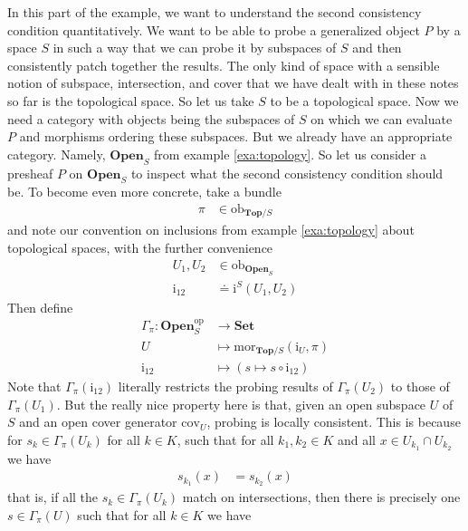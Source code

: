 \begin{exa}
\label{exa:gs2}
In this part of the example, we want to understand the second consistency condition quantitatively.
We want to be able to probe a generalized object $P$ by a space $S$ in such a way that we can probe it by subspaces of $S$ and then consistently patch together the results.
The only kind of space with a sensible notion of subspace, intersection, and cover that we have dealt with in these notes so far is the topological space.
So let us take $S$ to be a topological space.
Now we need a category with objects being the subspaces of $S$ on which we can evaluate $P$ and morphisms ordering these subspaces.
But we already have an appropriate category.
Namely, $\mathbf{Open}_{S}$ from example \ref{exa:topology}.
So let us consider a presheaf $P$ on $\mathbf{Open}_{S}$ to inspect what the second consistency condition should be.
To become even more concrete, take a bundle
\begin{align*}
  \pi
  &\in
  \mathrm{ob}_{\mathbf{Top} \slash S}
\end{align*}
and note our convention on inclusions from example \ref{exa:topology} about topological spaces, with the further convenience
\begin{align*}
  U_{1},
  U_{2}
  &\in
  \mathrm{ob}_{\mathbf{Open}_{S}}
  \\
  \mathrm{i}_{12}
  &\doteq
  \mathrm{i}^{S}(U_{1},U_{2})
\end{align*}
Then define
\begin{align*}
  \Gamma_{\pi}
  \colon
  \mathbf{Open}_{S}^{\mathrm{op}}
  &\rightarrow
  \mathbf{Set}
  \\
  U
  &\mapsto
  \mathrm{mor}_{\mathbf{Top} \slash S}(\mathrm{i}_{U},\pi)
  \\
  \mathrm{i}_{12}
  &\mapsto
  (s \mapsto s \circ \mathrm{i}_{12})
\end{align*}
Note that $\Gamma_{\pi}(\mathrm{i}_{12})$ literally restricts the probing results of $\Gamma_{\pi}(U_{2})$ to those of $\Gamma_{\pi}(U_{1})$.
But the really nice property here is that, given an open subspace $U$ of $S$ and an open cover generator $\mathrm{cov}_{U}$, probing is locally consistent.
This is because for $s_{k} \in \Gamma_{\pi}(U_{k})$ for all $k \in K$, such that for all $k_{1},k_{2} \in K$ and all $x \in U_{k_{1}} \cap U_{k_{2}}$ we have
\begin{align*}
  s_{k_{1}}(x)
  &=
  s_{k_{2}}(x)
\end{align*}
that is, if all the $s_{k} \in \Gamma_{\pi}(U_{k})$ match on intersections, then there is precisely one $s \in \Gamma_{\pi}(U)$ such that for all $k \in K$ we have

\end{exa}
